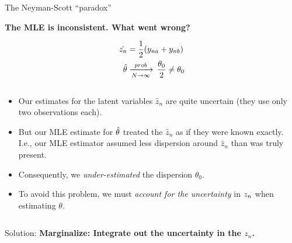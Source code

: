 
\begin{frame}{The Neyman-Scott ``paradox''}

\textbf{The MLE is inconsistent.  What went wrong?}

\begin{align*}
\hat{z_n} &= \frac{1}{2}(y_{na} + y_{nb}) \\
\hat\theta &\xrightarrow[N\rightarrow\infty]{prob}\, \frac{\theta_0}{2} \ne \theta_0
\end{align*}

\begin{columns}
    \begin{column}{0.8\textwidth}
\begin{itemize}
\item Our estimates for the latent variables $\hat{z}_n$ are quite uncertain (they use only
two observations each).
%
\item But our MLE estimate for $\hat\theta$ treated the $\hat{z}_n$ as if they
were known exactly.  I.e., our MLE estimator assumed less dispersion around
$\hat{z}_n$ than was truly present.
%
\item Consequently, we \emph{under-estimated} the dispersion $\theta_0$.
%
\item To avoid this problem, we must \emph{account for the uncertainty} in $z_n$
when estimating $\theta$.
%
\end{itemize}
\end{column}
\end{columns}

\vspace{2em}
Solution: \textbf{Marginalize: Integrate out the uncertainty in the $z_n$.}

\end{frame}





